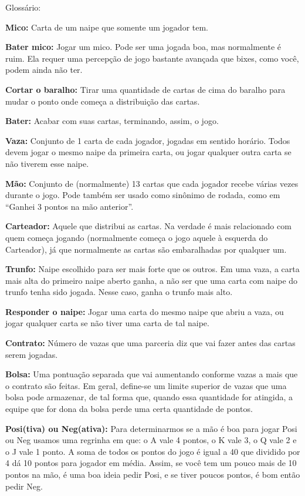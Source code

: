 \begin{subsecao}{Glossário:}

\textbf{Mico:} Carta de um naipe que somente um jogador tem.

\textbf{Bater mico:} Jogar um mico. Pode ser uma jogada boa, mas normalmente é
ruim. Ela requer uma percepção de jogo bastante avançada que bixes,
como você, podem ainda não ter.

\textbf{Cortar o baralho:} Tirar uma quantidade de cartas de cima do baralho para mudar
o ponto onde começa a distribuição das cartas.

\textbf{Bater:} Acabar com suas cartas, terminando, assim, o jogo.

\textbf{Vaza:} Conjunto de 1 carta de cada jogador, jogadas em sentido horário. Todos
devem jogar o mesmo naipe da primeira carta, ou jogar qualquer outra carta se
não tiverem esse naipe.

\textbf{Mão:} Conjunto de (normalmente) 13 cartas que cada jogador recebe várias vezes
durante o jogo. Pode também ser usado como sinônimo de rodada, como
em ``Ganhei 3 pontos na mão anterior''.

\textbf{Carteador:} Aquele que distribui as cartas. Na verdade é mais relacionado com
quem começa jogando (normalmente começa o jogo aquele à esquerda do Carteador),
já que normalmente as cartas são embaralhadas por qualquer um.

\textbf{Trunfo:} Naipe escolhido para ser mais forte que os outros. Em uma vaza, a carta
mais alta do primeiro naipe aberto ganha, a não ser que uma carta com naipe do
trunfo tenha sido jogada. Nesse caso, ganha o trunfo mais alto.

\textbf{Responder o naipe:} Jogar uma carta do mesmo naipe que abriu a vaza, ou jogar
qualquer carta se não tiver uma carta de tal naipe.

\textbf{Contrato:} Número de vazas que uma parceria diz que vai fazer antes das cartas
serem jogadas.

\textbf{Bolsa:} Uma pontuação separada que vai aumentando conforme vazas a mais que o
contrato são feitas. Em geral, define-se um limite superior de vazas que uma bolsa
pode armazenar, de tal forma que, quando essa quantidade for atingida, a equipe que for
dona da bolsa perde uma certa quantidade de pontos.

\textbf{Posi(tiva) ou Neg(ativa):} Para determinarmos se a mão é boa para jogar Posi ou
Neg usamos uma regrinha em que: o A vale 4 pontos, o K vale 3, o Q vale 2 e o J
vale 1 ponto. A soma de todos os pontos do jogo é igual a 40 que dividido por 4
dá 10 pontos para jogador em média. Assim, se você tem um pouco mais de 10
pontos na mão, é uma boa ideia pedir Posi, e se tiver poucos pontos, é bom
então pedir Neg.


\end{subsecao}
